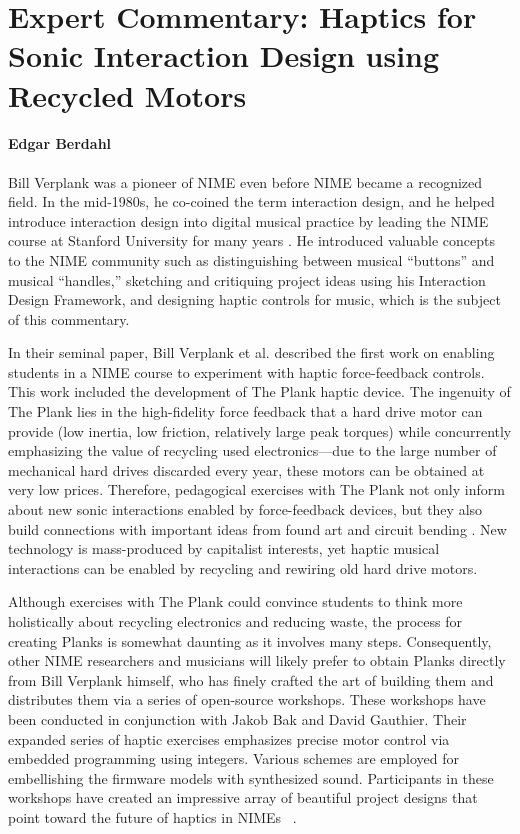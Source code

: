 \section*{Expert Commentary: Haptics for Sonic Interaction Design using Recycled Motors}
\paragraph{Edgar Berdahl}

%

Bill Verplank was a pioneer of NIME even before NIME became a recognized field. In the mid-1980s, he co-coined the term interaction design, and he helped introduce interaction design into digital musical practice by leading the NIME course at Stanford University for many years \cite{Berdahl:2013a}. He introduced valuable concepts to the NIME community such as distinguishing between musical ``buttons'' and musical ``handles,'' sketching and critiquing project ideas using his Interaction Design Framework, and designing haptic controls for music, which is the subject of this commentary.

In their seminal paper, Bill Verplank et al. described the first work on enabling students in a NIME course to experiment with haptic force-feedback controls. This work included the development of The Plank haptic device. The ingenuity of The Plank lies in the high-fidelity force feedback that a hard drive motor can provide (low inertia, low friction, relatively large peak torques) while concurrently emphasizing the value of recycling used electronics—due to the large number of mechanical hard drives discarded every year, these motors can be obtained at very low prices. Therefore, pedagogical exercises with The Plank not only inform about new sonic interactions enabled by force-feedback devices, but they also build connections with important ideas from found art and circuit bending \cite{Bak:2015,Ghazala:2005}. New technology is mass-produced by capitalist interests, yet haptic musical interactions can be enabled by recycling and rewiring old hard drive motors.

Although exercises with The Plank could convince students to think more holistically about recycling electronics and reducing waste, the process for creating Planks is somewhat daunting as it involves many steps. Consequently, other NIME researchers and musicians will likely prefer to obtain Planks directly from Bill Verplank himself, who has finely crafted the art of building them and distributes them via a series of open-source workshops. These workshops have been conducted in conjunction with Jakob Bak and David Gauthier. Their expanded series of haptic exercises emphasizes precise motor control via embedded programming using integers. Various schemes are employed for embellishing the firmware models with synthesized sound. Participants in these workshops have created an impressive array of beautiful project designs that point toward the future of haptics in NIMEs  \cite{Verplank:2001}.

